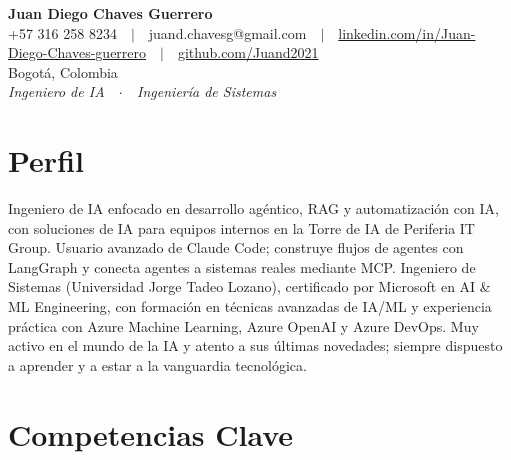 
\ifpdftex\usepackage[T1]{fontenc}\fi %


\begin{center}
{\large\bfseries\atsspaces Juan Diego Chaves Guerrero}\\[1pt]
{\small +57 316 258 8234\ \ $|$\ \ juand.chavesg@gmail.com\ \ $|$\ \ \href{https://linkedin.com/in/Juan-Diego-Chaves-guerrero}{linkedin.com/in/Juan-Diego-Chaves-guerrero}\ \ $|$\ \ \href{https://github.com/Juand2021}{github.com/Juand2021}}\\
{\small Bogotá, Colombia}\\[1pt]
{\small\itshape\textcolor{meta}{Ingeniero de IA\ \ $\cdot$\ \ Ingeniería de Sistemas}}
\end{center}
\vspace{-8pt}

\section{Perfil}
Ingeniero de IA enfocado en desarrollo agéntico, RAG y automatización con IA, con soluciones de IA para equipos internos en la Torre de IA de Periferia IT Group. Usuario avanzado de Claude Code; construye flujos de agentes con LangGraph y conecta agentes a sistemas reales mediante MCP. Ingeniero de Sistemas (Universidad Jorge Tadeo Lozano), certificado por Microsoft en AI \& ML Engineering, con formación en técnicas avanzadas de IA/ML y experiencia práctica con Azure Machine Learning, Azure OpenAI y Azure DevOps. Muy activo en el mundo de la IA y atento a sus últimas novedades; siempre dispuesto a aprender y a estar a la vanguardia tecnológica.

\section{Competencias Clave}

